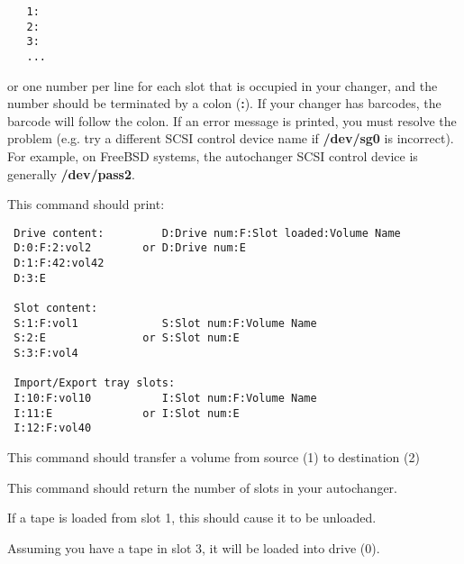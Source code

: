 \footnotesize
\begin{verbatim}
   1:
   2:
   3:
   ...

\end{verbatim}
\normalsize

or one number per line for each slot that is  occupied in your changer, and
the number should be  terminated by a colon ({\bf :}). If your changer has
barcodes, the barcode will follow the colon.  If an error message is printed,
you must resolve the  problem (e.g. try a different SCSI control device name
if {\bf /dev/sg0}  is incorrect). For example, on FreeBSD systems, the
autochanger  SCSI control device is generally {\bf /dev/pass2}.


This command should print:

\footnotesize
\begin{verbatim}
 Drive content:         D:Drive num:F:Slot loaded:Volume Name
 D:0:F:2:vol2        or D:Drive num:E
 D:1:F:42:vol42
 D:3:E

 Slot content:
 S:1:F:vol1             S:Slot num:F:Volume Name
 S:2:E               or S:Slot num:E
 S:3:F:vol4

 Import/Export tray slots:
 I:10:F:vol10           I:Slot num:F:Volume Name
 I:11:E              or I:Slot num:E
 I:12:F:vol40

\end{verbatim}
\normalsize


This command should transfer a volume from source (1) to destination (2)


This command should return the number of slots in your autochanger.


   If a tape is loaded from slot 1, this should cause it to be unloaded.


Assuming you have a tape in slot 3,  it will be loaded into drive (0).


